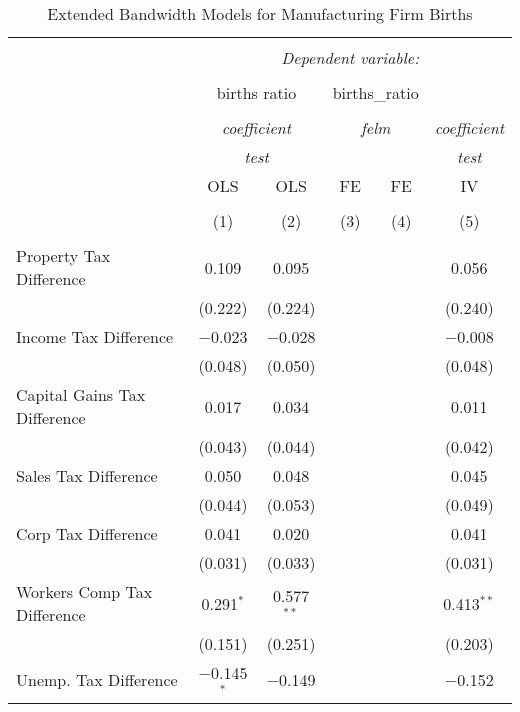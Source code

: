 
\begin{table}[!htbp] \centering 
  \caption{Extended Bandwidth Models for  Manufacturing Firm Births} 
  \label{} 
\begin{tabular}{@{\extracolsep{5pt}}lccccc} 
\\[-1.8ex]\hline 
\hline \\[-1.8ex] 
 & \multicolumn{5}{c}{\textit{Dependent variable:}} \\ 
\cline{2-6} 
\\[-1.8ex] & \multicolumn{2}{c}{births ratio} & \multicolumn{2}{c}{births\_ratio} &   \\ 
\\[-1.8ex] & \multicolumn{2}{c}{\textit{coefficient}} & \multicolumn{2}{c}{\textit{felm}} & \textit{coefficient} \\ 
 & \multicolumn{2}{c}{\textit{test}} & \multicolumn{2}{c}{\textit{}} & \textit{test} \\ 
 & OLS & OLS & FE & FE & IV \\ 
\\[-1.8ex] & (1) & (2) & (3) & (4) & (5)\\ 
\hline \\[-1.8ex] 
 Property Tax Difference & 0.109 & 0.095 &  &  & 0.056 \\ 
  & (0.222) & (0.224) &  &  & (0.240) \\ 
  Income Tax Difference & $-$0.023 & $-$0.028 &  &  & $-$0.008 \\ 
  & (0.048) & (0.050) &  &  & (0.048) \\ 
  Capital Gains Tax Difference & 0.017 & 0.034 &  &  & 0.011 \\ 
  & (0.043) & (0.044) &  &  & (0.042) \\ 
  Sales Tax Difference & 0.050 & 0.048 &  &  & 0.045 \\ 
  & (0.044) & (0.053) &  &  & (0.049) \\ 
  Corp Tax Difference & 0.041 & 0.020 &  &  & 0.041 \\ 
  & (0.031) & (0.033) &  &  & (0.031) \\ 
  Workers Comp Tax Difference & 0.291$^{*}$ & 0.577$^{**}$ &  &  & 0.413$^{**}$ \\ 
  & (0.151) & (0.251) &  &  & (0.203) \\ 
  Unemp. Tax Difference & $-$0.145$^{*}$ & $-$0.149 &  &  & $-$0.152 \\ 

\end{tabular}
\end{table}
